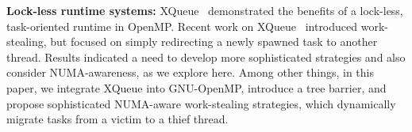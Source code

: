 \textbf{Lock-less runtime systems:}
XQueue~\cite{nookala_enabling_2021} demonstrated the benefits of a lock-less, task-oriented runtime in OpenMP.  
Recent work on XQueue~\cite{NOOKALA2024444} introduced work-stealing, but focused on simply redirecting a newly spawned task to another thread. Results indicated a need to develop more sophisticated strategies and also consider NUMA-awareness, as we explore here.
Among other things, in this paper, we integrate XQueue into GNU-OpenMP, introduce a tree barrier, and propose sophisticated NUMA-aware work-stealing strategies, which dynamically migrate tasks from a victim to a thief thread.


